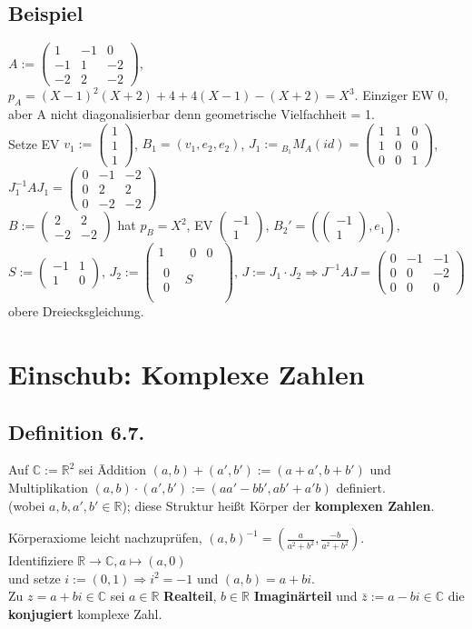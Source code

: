 \documentclass[a4paper, 12pt]{extarticle}
\newcommand{\twoXtwo}[4] {
	\left( 
	\begin{matrix}
		#1 & #2 \\
		#3 & #4
	\end{matrix} 
	\right)
}
\newcommand{\threeXthree}[9] {
	\left( 
	\begin{matrix}
		#1 & #2 & #3\\
		#4 & #5 & #6\\
		#7 & #8 & #9
	\end{matrix}
	\right)
}
\newcommand{\vecTwo}[2] {
	\left( 
	\begin{matrix}
		#1\\
		#2
	\end{matrix} 
	\right)
}
\newcommand{\vecThree}[3] {
	\left( 
	\begin{matrix}
		#1\\
		#2\\
		#3
	\end{matrix} 
	\right)
}
\begin{document}
\subsection*{Beispiel}
$A:= \threeXthree{1}{-1}{0}{-1}{1}{-2}{-2}{2}{-2}$, $p_A = (X-1)^2(X+2)+4+4(X-1)-(X+2)=X^3$. 
Einziger EW 0, aber A nicht diagonalisierbar denn geometrische Vielfachheit = 1. \\
Setze EV $v_1:= \vecThree{1}{1}{1}$, $B_1=(v_1, e_2, e_2)$, $J_1:= {}_{B_1}M_A(id) = \threeXthree{1}{1}{0}{1}{0}{0}{0}{0}{1}$, $J^{-1}_1AJ_1 = \threeXthree{0}{-1}{-2}{0}{2}{2}{0}{-2}{-2}$ \\
$B:= \twoXtwo{2}{2}{-2}{-2}$ hat $p_B = X^2$, EV $\vecTwo{-1}{1}$, $B_2'=(\vecTwo{-1}{1}, e_1)$, \\ $S:=\twoXtwo{-1}{1}{1}{0}$, $J_2:=\left( 
\begin{matrix}
	1 & \begin{matrix} 0 & 0 \end{matrix} \\
	\begin{matrix} 0 \\ 0 \end{matrix} & S\\
\end{matrix}
\right)$, $J:=J_1\cdot J_2 \Rightarrow J^{-1}AJ = \threeXthree{0}{-1}{-1}{0}{0}{-2}{0}{0}{0}$ obere Dreiecksgleichung.
\section*{Einschub: Komplexe Zahlen}
\subsection*{Definition 6.7.}
\begin{tabbing}
	Auf $\mathbb{C} := \mathbb{R}^2$ sei \=Addition $(a, b) + (a', b') := (a+a', b+b')$ und\\
	\>Multiplikation $(a, b) \cdot (a', b') := (aa'-bb', ab'+a'b)$ definiert.\\ (wobei $a, b, a', b' \in \mathbb{R}$); diese Struktur heißt Körper der \textbf{komplexen Zahlen}.
\end{tabbing}
Körperaxiome leicht nachzuprüfen, $(a, b)^{-1} = (\frac{a}{a^2+b^2}, \frac{-b}{a^2+b^2})$.\\
Identifiziere $\mathbb{R} \longrightarrow \mathbb{C}, a \longmapsto (a, 0)$\\ und setze $i := (0,1) \Rightarrow i^2 = -1$ und $(a, b) = a+bi$.\\
Zu $z = a+bi \in \mathbb{C}$ sei $a\in\mathbb{R}$ \textbf{Realteil}, $b\in\mathbb{R}$ \textbf{Imaginärteil} und $\bar{z} := a - bi \in \mathbb{C}$ die \textbf{konjugiert} komplexe Zahl.\\
\end{document}
